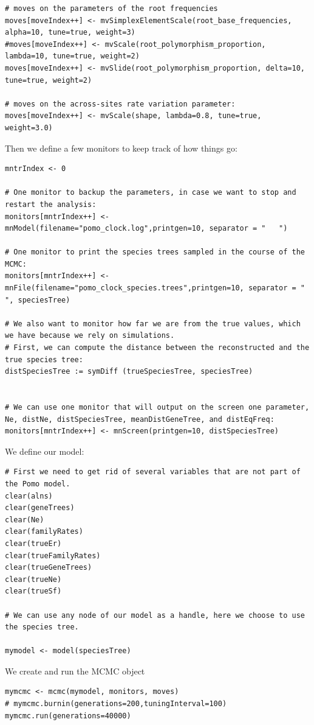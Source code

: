 \documentclass[11pt]{article}
\begin{document}
{\begin{framed}
{\begin{snugshade*}
\begin{lstlisting}
# moves on the parameters of the root frequencies
moves[moveIndex++] <- mvSimplexElementScale(root_base_frequencies, alpha=10, tune=true, weight=3) 
#moves[moveIndex++] <- mvScale(root_polymorphism_proportion, lambda=10, tune=true, weight=2) 
moves[moveIndex++] <- mvSlide(root_polymorphism_proportion, delta=10, tune=true, weight=2) 

# moves on the across-sites rate variation parameter:
moves[moveIndex++] <- mvScale(shape, lambda=0.8, tune=true, weight=3.0)
\end{lstlisting}
\end{snugshade*}}

Then we define a few monitors to keep track of how things go:
 {\tt \begin{snugshade*}
\begin{lstlisting}
mntrIndex <- 0

# One monitor to backup the parameters, in case we want to stop and restart the analysis:
monitors[mntrIndex++] <- mnModel(filename="pomo_clock.log",printgen=10, separator = "	")

# One monitor to print the species trees sampled in the course of the MCMC:
monitors[mntrIndex++] <- mnFile(filename="pomo_clock_species.trees",printgen=10, separator = "	", speciesTree)

# We also want to monitor how far we are from the true values, which we have because we rely on simulations.
# First, we can compute the distance between the reconstructed and the true species tree:
distSpeciesTree := symDiff (trueSpeciesTree, speciesTree)


# We can use one monitor that will output on the screen one parameter, Ne, distNe, distSpeciesTree, meanDistGeneTree, and distEqFreq:
monitors[mntrIndex++] <- mnScreen(printgen=10, distSpeciesTree)
\end{lstlisting}
\end{snugshade*}}
We define our model:
 {\tt \begin{snugshade*}
\begin{lstlisting}
# First we need to get rid of several variables that are not part of the Pomo model.
clear(alns)
clear(geneTrees)
clear(Ne)
clear(familyRates)
clear(trueEr)
clear(trueFamilyRates)
clear(trueGeneTrees)
clear(trueNe)
clear(trueSf)

# We can use any node of our model as a handle, here we choose to use the species tree.
 
mymodel <- model(speciesTree)
\end{lstlisting}
\end{snugshade*}}

We create and run the MCMC object

 {\tt \begin{snugshade*}
\begin{lstlisting}
mymcmc <- mcmc(mymodel, monitors, moves)
# mymcmc.burnin(generations=200,tuningInterval=100)
mymcmc.run(generations=40000)
\end{lstlisting}
\end{snugshade*}}
 \end{framed}}
\end{document}

